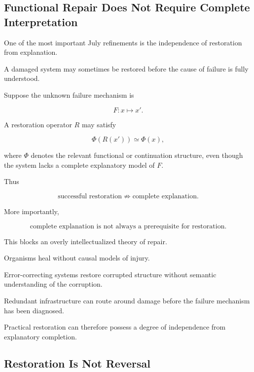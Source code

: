 \documentclass[11pt]{article}
\theoremstyle{remark}
\begin{document}
\subsection{Functional Repair Does Not Require Complete Interpretation}

One of the most important July refinements is the independence of restoration from explanation.

A damaged system may sometimes be restored before the cause of failure is fully understood.

Suppose the unknown failure mechanism is

\begin{equation}
F:x\mapsto x'.
\end{equation}

A restoration operator $R$ may satisfy

\begin{equation}
\Phi(R(x'))
\simeq
\Phi(x),
\end{equation}

where $\Phi$ denotes the relevant functional or continuation structure, even though the system lacks a complete explanatory model of $F$.

Thus

\begin{equation}
\boxed{
\text{successful restoration}
\not\Rightarrow
\text{complete explanation}.
}
\end{equation}

More importantly,

\begin{equation}
\boxed{
\text{complete explanation}
\text{ is not always a prerequisite for restoration}.
}
\end{equation}

This blocks an overly intellectualized theory of repair.

Organisms heal without causal models of injury.

Error-correcting systems restore corrupted structure without semantic understanding of the corruption.

Redundant infrastructure can route around damage before the failure mechanism has been diagnosed.

Practical restoration can therefore possess a degree of independence from explanatory completion.

\subsection{Restoration Is Not Reversal}
\end{document}

